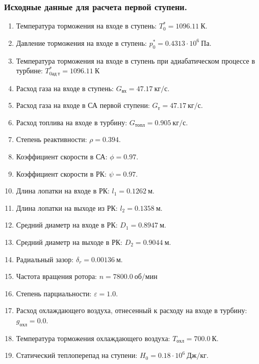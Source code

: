 \documentclass[a4paper,12pt]{article}
\begin{document}
    \subsubsection{Исходные данные для расчета первой ступени.}
%    
    \begin{enumerate}

        \item Температура торможения на входе в ступень: $T_0^* = 1096.11\ К $.
        \item Давление торможения на входе в ступень: $p_0^* = 0.4313 \cdot 10^6 \ Па$.
        \item Температура торможения на входе в ступень при адиабатическом процессе в турбине: $T_{0ад\ т}^* = 1096.11\ К$
        \item Расход газа на входе в ступень: $G_{вх} = 47.17\ кг/с$.
        \item Расход газа на входе в СА первой ступени: $ G_т = 47.17\ кг/с $.
        \item Расход топлива на входе в турбину: $ G_{топл} = 0.905\ кг/с $.
        \item Степень реактивности: $ \rho = 0.394 $.
        \item Коэффициент скорости в СА: $ \phi = 0.97 $.
        \item Коэффициент скорости в РК: $ \psi = 0.97 $.
        \item Длина лопатки на входе в РК: $ l_1 = 0.1262\ м $.
        \item Длина лопатки на выходе из РК: $ l_2 = 0.1358\ м $.
        \item Средний диаметр на входе в РК: $ D_1 = 0.8947\ м $.
        \item Средний диаметр на выходе в РК: $ D_2 = 0.9044\ м $.
        \item Радиальный зазор: $ \delta_r = 0.00136\ м $.
        \item Частота вращения ротора: $ n = 7800.0\ об/мин $
        \item Степень парциальности: $ \varepsilon = 1.0 $.
        \item Расход охлаждающего воздуха, отнесенный к расходу на входе в турбину: $ g_{охл} = 0.0 $.
        \item Температура торможения охлаждающего воздуха: $ T_{охл} = 700.0\ К $.

        
        \item Статический теплоперепад на ступени: $ H_0 = 0.18 \cdot 10^6 \ Дж/кг $.

        

    \end{enumerate}
    
\end{document}
